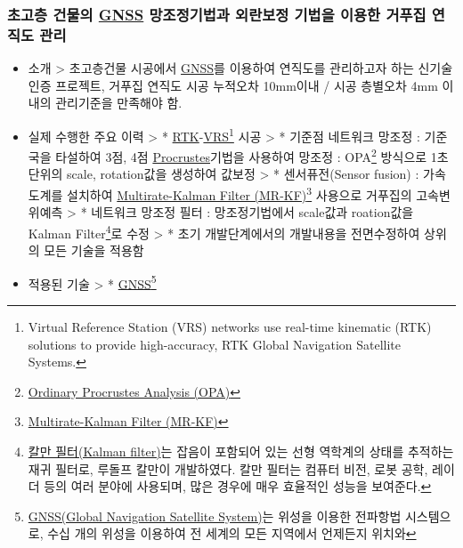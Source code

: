 \documentclass[]{article}
\begin{document}
\subsubsection{초고층 건물의 \href{http://gnss.ngii.go.kr/info/summary}{GNSS} 망조정기법과 외란보정 기법을 이용한 거푸집 연직도 관리}

\begin{itemize}
\item
  소개 \textgreater{} 초고층건물 시공에서
  \href{http://gnss.ngii.go.kr/info/summary}{GNSS}를 이용하여 연직도를
  관리하고자 하는 신기술 인증 프로젝트, 거푸집 연직도 시공 누적오차
  10mm이내 / 시공 층별오차 4mm 이내의 관리기준을 만족해야 함.
\item
  실제 수행한 주요 이력 \textgreater{} *
  \href{https://en.wikipedia.org/wiki/Real_Time_Kinematic}{RTK}-\href{https://en.wikipedia.org/wiki/Virtual_Reference_Station}{VRS}\footnote{Virtual
    Reference Station (VRS) networks use real-time kinematic (RTK)
    solutions to provide high-accuracy, RTK Global Navigation Satellite
    Systems.} 시공 \textgreater{} * 기준점 네트워크 망조정 : 기준국을
  타설하여 3점, 4점
  \href{https://en.wikipedia.org/wiki/Procrustes_analysis}{Procrustes}기법을
  사용하여 망조정 : OPA\footnote{\href{https://en.wikipedia.org/wiki/Procrustes_analysis}{Ordinary
    Procrustes Analysis (OPA)}} 방식으로 1초단위의 scale, rotation값을
  생성하여 값보정 \textgreater{} * 센서퓨전(Sensor fusion) : 가속도계를
  설치하여
  \href{http://scholar.lib.vt.edu/theses/available/etd-062899-064821/unrestricted/etd.PDF}{Multirate-Kalman
  Filter (MR-KF)}\footnote{\href{http://scholar.lib.vt.edu/theses/available/etd-062899-064821/unrestricted/etd.PDF}{Multirate-Kalman
    Filter (MR-KF)}} 사용으로 거푸집의 고속변위예측 \textgreater{} *
  네트워크 망조정 필터 : 망조정기법에서 scale값과 roation값을 Kalman
  Filter\footnote{\href{https://ko.wikipedia.org/wiki/\%EC\%B9\%BC\%EB\%A7\%8C_\%ED\%95\%84\%ED\%84\%B0}{칼만
    필터(Kalman filter)}는 잡음이 포함되어 있는 선형 역학계의 상태를
    추적하는 재귀 필터로, 루돌프 칼만이 개발하였다. 칼만 필터는 컴퓨터
    비전, 로봇 공학, 레이더 등의 여러 분야에 사용되며, 많은 경우에 매우
    효율적인 성능을 보여준다.}로 수정 \textgreater{} * 초기
  개발단계에서의 개발내용을 전면수정하여 상위의 모든 기술을 적용함
\item
  적용된 기술 \textgreater{} *
  \href{http://gnss.ngii.go.kr/info/summary}{GNSS}\footnote{\href{http://gnss.ngii.go.kr/info/summary}{GNSS(Global
    Navigation Satellite System)}는 위성을 이용한 전파항법 시스템으로,
    수십 개의 위성을 이용하여 전 세계의 모든 지역에서 언제든지 위치와
}
\end{itemize}
\end{document}
